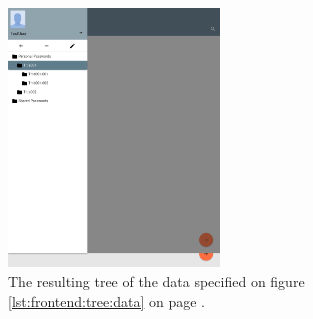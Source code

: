 		\begin{figure}[!htb]
			\centering
			\includegraphics[width=0.5\textwidth,clip,trim=0 690 536 210]{figures/implementation/screenshots/example_tree.png}
			\caption{The resulting tree of the data specified on figure \ref{lst:frontend:tree:data} on page \pageref{lst:frontend:tree:data}.}
			\label{lst:frontend:tree:result}
		\end{figure}